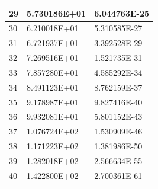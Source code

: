 \documentclass[
10pt, %
a4paper, %
oneside, %
headinclude,footinclude, %
BCOR5mm, %
]{scrartcl}
\theoremstyle{definition}
\begin{document}
\begin{centering}
\begin{tabular}{lll}
\hline
29&5.730186E+01&6.044763E-25\\
\hline
30&6.210018E+01&5.310585E-27\\
\hline
31&6.721937E+01&3.392528E-29\\
\hline
32&7.269516E+01&1.521735E-31\\
\hline
33&7.857280E+01&4.585292E-34\\
\hline
34&8.491123E+01&8.762159E-37\\
\hline
35&9.178987E+01&9.827416E-40\\
\hline
36&9.932081E+01&5.801152E-43\\
\hline
37&1.076724E+02&1.530909E-46\\
\hline
38&1.171223E+02&1.381986E-50\\
\hline
39&1.282018E+02&2.566634E-55\\
\hline
40&1.422800E+02&2.700361E-61\\
\hline
\end{tabular}
\end{centering}



\end{document}
